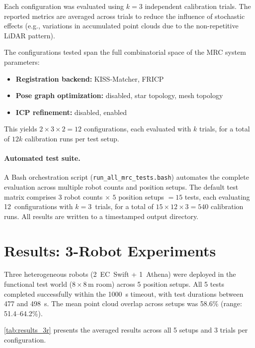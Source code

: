 Each configuration was evaluated using $k = 3$ independent calibration
trials.
The reported metrics are averaged across trials to reduce the influence
of stochastic effects (e.g., variations in accumulated point clouds
due to the non-repetitive LiDAR pattern).

The configurations tested span the full combinatorial space of the
MRC system parameters:
\begin{itemize}
    \item \textbf{Registration backend:} KISS-Matcher, FRICP
    \item \textbf{Pose graph optimization:} disabled, star topology,
          mesh topology
    \item \textbf{ICP refinement:} disabled, enabled
\end{itemize}
This yields $2 \times 3 \times 2 = 12$ configurations, each
evaluated with $k$ trials, for a total of $12k$ calibration runs
per test setup.

\paragraph{Automated test suite.}
A Bash orchestration script (\texttt{run\_all\_mrc\_tests.bash})
automates the complete evaluation across multiple robot counts and
position setups.
The default test matrix comprises $3$ robot counts $\times$
$5$ position setups $= 15$ tests, each evaluating 12~configurations
with $k = 3$~trials, for a total of $15 \times 12 \times 3 = 540$
calibration runs.
All results are written to a timestamped output directory.

\section{Results: 3-Robot Experiments}
\label{sec:results_3robots}

Three heterogeneous robots (2~EC~Swift + 1~Athena) were deployed in
the functional test world ($8 \times 8$\,m room) across 5 position
setups.
All 5 tests completed successfully within the \SI{1000}{\second}
timeout, with test durations between 477 and \SI{498}{\second}.
The mean point cloud overlap across setups was 58.6\%
(range: 51.4--64.2\%).

\autoref{tab:results_3r} presents the averaged results across all
5 setups and 3 trials per configuration.

